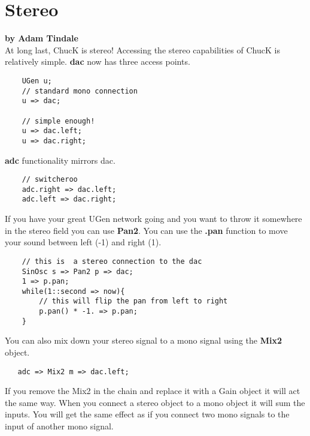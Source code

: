 \section{Stereo}
\textbf{by Adam Tindale}\\

At long last, ChucK is stereo! Accessing the stereo capabilities of ChucK is relatively simple. {\bf dac} now has three access points. 

\begin{verbatim}
    UGen u;
    // standard mono connection
    u => dac;

    // simple enough!
    u => dac.left;
    u => dac.right;
\end{verbatim}

{\bf adc} functionality mirrors dac. 

\begin{verbatim}
    // switcheroo
    adc.right => dac.left;
    adc.left => dac.right;
\end{verbatim}

If you have your great UGen network going and you want to throw it somewhere in the stereo field you can use {\bf Pan2}. You can use the {\bf .pan} function to move your sound between left (-1) and right (1).

\begin{verbatim}
    // this is  a stereo connection to the dac
    SinOsc s => Pan2 p => dac;
    1 => p.pan;
    while(1::second => now){
        // this will flip the pan from left to right
        p.pan() * -1. => p.pan;
    }
\end{verbatim}


You can also mix down your stereo signal to a mono signal using the {\bf Mix2} object. 

\begin{verbatim}
   adc => Mix2 m => dac.left;
\end{verbatim}

If you remove the Mix2 in the chain and replace it with a Gain object it will act the same way. When you connect a stereo object to a mono object it will sum the inputs. You will get the same effect as if you connect two mono signals to the input of another mono signal. 